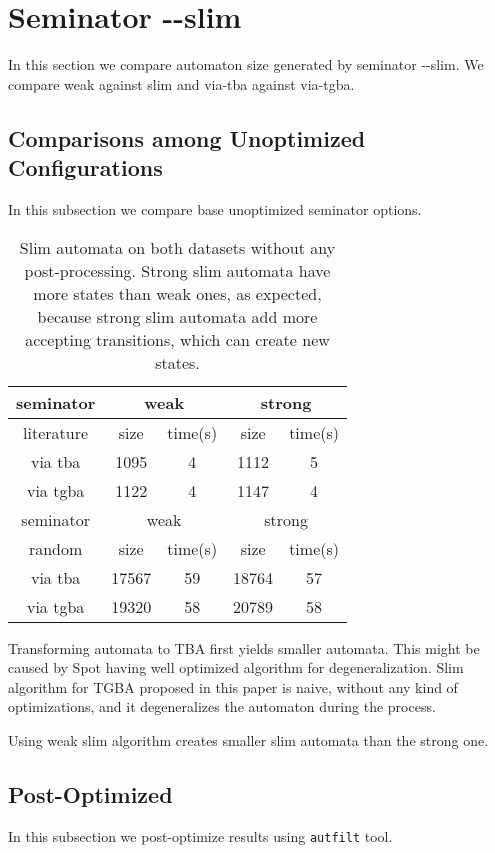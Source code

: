 \documentclass[
	digital
nolof, nolot
]{fithesis3}
\begin{document}
	
	\section{Seminator -\/-slim}
	In this section we compare automaton size generated by seminator -{}-slim.
	We compare weak against slim and via-tba against via-tgba.
	\subsection{Comparisons among Unoptimized Configurations}
	In this subsection we compare base unoptimized seminator options.
\begin{table}[ht]
	\centering
	\caption{Slim automata on both datasets without any post-processing. Strong slim automata have more states than weak ones, as expected, because strong slim automata add more accepting transitions, which can create new states. }
		\begin{tabular}{ |c||c|c|c|c| } 
			\hline
			seminator&\multicolumn{2}{c|}{weak}&\multicolumn{2}{c|}{strong} \\
			\hline
			literature&size&time(s)&size&time(s)\\
			\hhline{|=====|}
			
			via tba	&	1095	&4	& 1112 	&5\\
			\hline
			via tgba&	1122	&4		&1147	&4\\ 
			\hline
			\hline
			\hline
			seminator&\multicolumn{2}{c|}{weak}&\multicolumn{2}{c|}{strong} \\
			\hhline{|=====|}
			random&size&time(s)&size&time(s)\\
			\hline
			via tba&17567&	59& 18764 &57\\
			\hline
			via tgba&19320&	58& 20789&58\\ 
			\hline
		\end{tabular}
\end{table}
	
	

	
	
	Transforming automata to TBA first yields smaller automata. This might be caused by Spot having well optimized algorithm for degeneralization. Slim algorithm for TGBA proposed in this paper is naive, without any kind of optimizations, and it degeneralizes the automaton during the process.
	
	Using weak slim algorithm creates smaller slim automata than the strong one. 

	\subsection{Post-Optimized}
	In this subsection we post-optimize results using \texttt{autfilt} tool.
	
\end{document}
